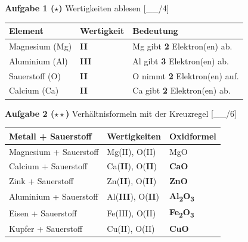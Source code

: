\documentclass[10pt, a4paper]{article}
\newcommand{\lsg}[1]{\textcolor{loesung}{\textbf{#1}}}
\newcommand{\punktebox}[1]{\hfill\small\textcolor{mittelgrau}{[\_\_/#1]}}
\newcommand{\aufgabe}[2]{%
    \vspace{6pt}%
    \noindent\textbf{\textcolor{fachfarbe}{Aufgabe #1}} #2%
    \vspace{3pt}%
    \nopagebreak[4]%
}
\begin{document}

\aufgabe{1 ($\star$)}{Wertigkeiten ablesen} \punktebox{4}

\small
\begin{tabular}{|p{3cm}|p{2cm}|p{8cm}|}
\hline
\textbf{Element} & \textbf{Wertigkeit} & \textbf{Bedeutung} \\
\hline
Magnesium (Mg) & \lsg{II} & Mg gibt \lsg{2} Elektron(en) ab. \\
\hline
Aluminium (Al) & \lsg{III} & Al gibt \lsg{3} Elektron(en) ab. \\
\hline
Sauerstoff (O) & \lsg{II} & O nimmt \lsg{2} Elektron(en) auf. \\
\hline
Calcium (Ca) & \lsg{II} & Ca gibt \lsg{2} Elektron(en) ab. \\
\hline
\end{tabular}

\vspace{4pt}


\aufgabe{2 ($\star\star$)}{Verhältnisformeln mit der Kreuzregel} \punktebox{6}

\small
\begin{tabular}{|p{4cm}|p{3cm}|p{5cm}|}
\hline
\textbf{Metall + Sauerstoff} & \textbf{Wertigkeiten} & \textbf{Oxidformel} \\
\hline
Magnesium + Sauerstoff & Mg(II), O(II) & MgO \\
\hline
Calcium + Sauerstoff & Ca(\lsg{II}), O(\lsg{II}) & \lsg{CaO} \\
\hline
Zink + Sauerstoff & Zn(\lsg{II}), O(\lsg{II}) & \lsg{ZnO} \\
\hline
Aluminium + Sauerstoff & Al(\lsg{III}), O(\lsg{II}) & \lsg{Al\textsubscript{2}O\textsubscript{3}} \\
\hline
Eisen + Sauerstoff & Fe(III), O(II) & \lsg{Fe\textsubscript{2}O\textsubscript{3}} \\
\hline
Kupfer + Sauerstoff & Cu(II), O(II) & \lsg{CuO} \\
\hline
\end{tabular}

\newpage

\end{document}
